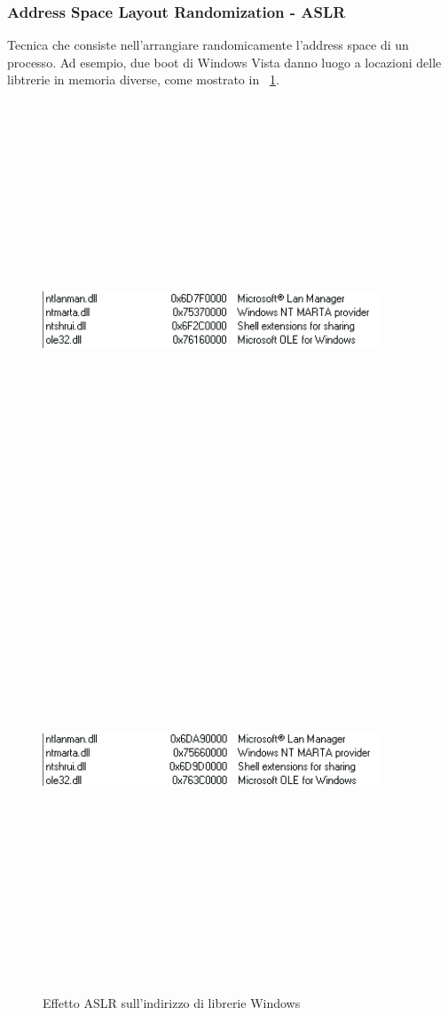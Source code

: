 \subsubsection{Address Space Layout Randomization - ASLR}
Tecnica che consiste nell'arrangiare randomicamente l'address space di un processo. Ad esempio, due boot di Windows Vista danno luogo a locazioni delle libtrerie in memoria diverse, come mostrato in \figurename ~\ref{fig:aslr}.
\begin{figure}[htbp]
	\centering%
	\subfigure%
	{\includegraphics[height=13cm, width=10cm, keepaspectratio]{Immagini/sistemi_operativi/aslr.png}}
	{\includegraphics[height=13cm, width=10cm, keepaspectratio]{Immagini/sistemi_operativi/aslr_2.png}}
	\caption{Effetto ASLR sull'indirizzo di librerie Windows\label{fig:aslr}} 	
\end{figure}
